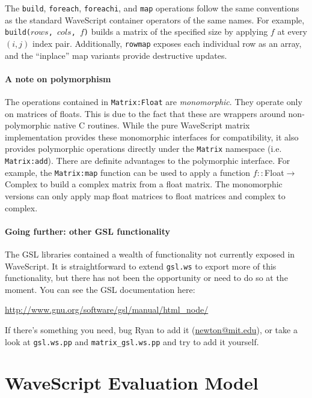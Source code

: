 \documentclass[twocolumn]{report}
\newcommand{\ra}{\ensuremath{\rightarrow}}
\begin{document}
The {\tt build}, {\tt foreach}, {\tt foreachi}, and {\tt map}
operations follow the same conventions as the standard WaveScript
container operators of the same names.  For example, {\tt
build($rows$, $cols$, $f$)} builds a matrix of the specified size by
applying $f$ at every $(i,j)$ index pair.  Additionally, {\tt rowmap}
exposes each individual row as an array, and the ``inplace'' map
variants provide destructive updates.

\subsubsection{A note on polymorphism}

The operations contained in {\tt Matrix:Float} are {\em monomorphic}.
They operate only on matrices of floats.  This is due to the fact that
these are wrappers around non-polymorphic native C routines.  While
the pure WaveScript matrix implementation provides these monomorphic
interfaces for compatibility, it also provides polymorphic operations
directly under the {\tt Matrix} namespace (i.e. {\tt Matrix:add}).
There are definite advantages to the polymorphic interface.  For
example, the {\tt Matrix:map} function can be used to apply a function
$f :: $Float$ \ra $Complex to build a complex matrix from a float
matrix.  The monomorphic versions can only apply map float matrices to
float matrices and complex to complex.

\subsubsection{Going further: other GSL functionality}

The GSL libraries contained a wealth of functionality not currently
exposed in WaveScript.  It is straightforward to extend {\tt gsl.ws}
to export more of this functionality, but there has not been the
opportunity or need to do so at the moment.  You can see the GSL
documentation here:

\vspace{-2mm}
\begin{center}
\url{http://www.gnu.org/software/gsl/manual/html_node/}
\end{center}

If there's something you need, bug Ryan to add
it (\url{newton@mit.edu}), or take a look at {\tt gsl.ws.pp} and {\tt matrix\_gsl.ws.pp} and
try to add it yourself.


\chapter{WaveScript Evaluation Model}
\end{document}
